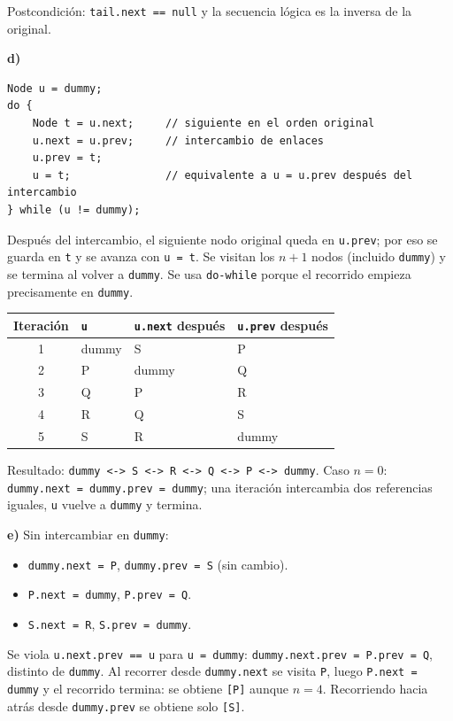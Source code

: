 \documentclass[11pt,a4paper]{article}
\begin{document}
Postcondición: \texttt{tail.next == null} y la secuencia lógica es la inversa de la original.

\textbf{d)}
\begin{lstlisting}
Node u = dummy;
do {
    Node t = u.next;     // siguiente en el orden original
    u.next = u.prev;     // intercambio de enlaces
    u.prev = t;
    u = t;               // equivalente a u = u.prev después del intercambio
} while (u != dummy);
\end{lstlisting}

Después del intercambio, el siguiente nodo original queda en \texttt{u.prev}; por eso se guarda en \texttt{t} y se avanza con \texttt{u = t}. Se visitan los $n + 1$ nodos (incluido \texttt{dummy}) y se termina al volver a \texttt{dummy}. Se usa \texttt{do-while} porque el recorrido empieza precisamente en \texttt{dummy}.

\begin{center}
\small
\begin{tabular}{clll}
\toprule
Iteración & \texttt{u} & \texttt{u.next} después & \texttt{u.prev} después \\
\midrule
1 & dummy & S & P \\
2 & P & dummy & Q \\
3 & Q & P & R \\
4 & R & Q & S \\
5 & S & R & dummy \\
\bottomrule
\end{tabular}
\end{center}

Resultado: \texttt{dummy <-> S <-> R <-> Q <-> P <-> dummy}. Caso $n = 0$: \texttt{dummy.next = dummy.prev = dummy}; una iteración intercambia dos referencias iguales, \texttt{u} vuelve a \texttt{dummy} y termina.

\textbf{e)} Sin intercambiar en \texttt{dummy}:
\begin{itemize}[itemsep=0pt]
\item \texttt{dummy.next = P}, \texttt{dummy.prev = S} (sin cambio).
\item \texttt{P.next = dummy}, \texttt{P.prev = Q}.
\item \texttt{S.next = R}, \texttt{S.prev = dummy}.
\end{itemize}
Se viola \texttt{u.next.prev == u} para \texttt{u = dummy}: \texttt{dummy.next.prev = P.prev = Q}, distinto de \texttt{dummy}. Al recorrer desde \texttt{dummy.next} se visita \texttt{P}, luego \texttt{P.next = dummy} y el recorrido termina: se obtiene \texttt{[P]} aunque $n = 4$. Recorriendo hacia atrás desde \texttt{dummy.prev} se obtiene solo \texttt{[S]}.
\end{document}
